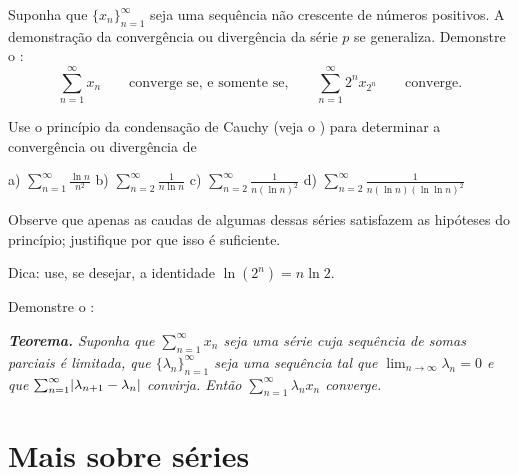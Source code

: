 \begin{exercise}[Desafiador] \label{exercise:cauchycondensation}
Suponha que $\{ x_n\}_{n=1}^\infty$ seja uma sequência não crescente de números positivos.
A demonstração da convergência ou divergência da série $p$ se generaliza.
Demonstre o
\emph{}:
\begin{equation*}
\sum_{n=1}^\infty x_n
\qquad \text{converge se, e somente se,} \qquad
\sum_{n=1}^\infty 2^n x_{2^n} \qquad \text{converge}.
\end{equation*}
\end{exercise}

\begin{exercise}
Use o princípio da condensação de Cauchy
(veja o )
para determinar a convergência ou divergência de

\medskip

\noindent
a) $\displaystyle \sum_{n=1}^\infty \frac{\ln n}{n^2}$
\qquad
b) $\displaystyle \sum_{n=2}^\infty \frac{1}{n \ln n}$
\qquad
c) $\displaystyle \sum_{n=2}^\infty \frac{1}{n {(\ln n)}^2}$
\qquad
d) $\displaystyle \sum_{n=2}^\infty \frac{1}{n (\ln n ){(\ln \ln n)}^2}$

\medskip

\noindent
Observe que apenas as caudas de algumas dessas séries satisfazem as
hipóteses do princípio; justifique por que isso é suficiente.

\noindent
Dica: use, se desejar, a identidade $\ln (2^n) = n \ln 2$.
\end{exercise}

\begin{exercise}[Desafiador]
Demonstre o \emph{}:

\medskip

\noindent
\emph{\textbf{Teorema.} Suponha que $\sum_{n=1}^\infty x_n$ seja uma série cuja sequência de somas parciais
é limitada, que $\{ \lambda_n \}_{n=1}^\infty$ seja uma sequência tal que
$\lim_{n\to\infty} \lambda_n = 0$ e que
$\sum_{n=1}^\infty \lvert { \lambda_{n+1} - \lambda_n } \rvert$ convirja.
Então $\sum_{n=1}^\infty \lambda_n x_n$ converge.}
\end{exercise}




\sectionnewpage
\section{Mais sobre séries}
\label{sec:moreonseries}

